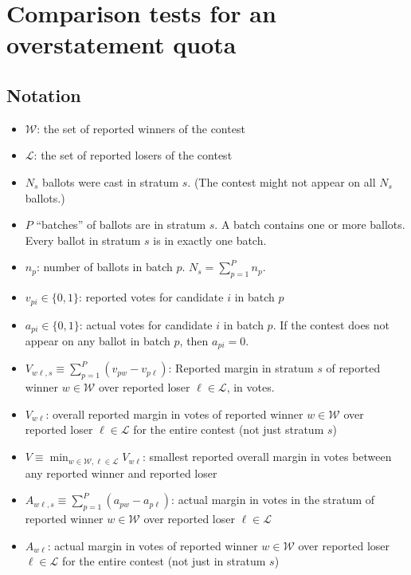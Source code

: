 \documentclass[runningheads]{llncs}
\begin{document}
\appendix
\section{Comparison tests for an overstatement quota}\label{sec:appendix-comparison}
\subsection{Notation}
\begin{itemize}
    \item  $\mathcal{W}$: the set of reported winners of the contest
    \item  $\mathcal{L}$: the set of reported losers of the contest
    \item  $N_s$ ballots were cast in stratum $s$. (The contest might not appear on all $N_s$ ballots.)
    \item  $P$ ``batches'' of ballots are in stratum $s$. A batch contains one or more ballots. Every ballot in stratum $s$ is in exactly one batch.
    \item  $n_p$: number of ballots in batch $p$. $N_s = \sum_{p=1}^P n_p$.
    \item  $v_{pi} \in \{0, 1\}$: reported votes for candidate $i$ in batch $p$
    \item  $a_{pi} \in \{0, 1\}$: actual votes for candidate $i$ in batch $p$. 
                  If the contest does not appear on any ballot in batch $p$, then $a_{pi} = 0$.
                  
    \item  $V_{w\ell,s} \equiv \sum_{p=1}^P (v_{pw} - v_{p\ell})$: 
Reported margin in stratum $s$ of reported winner $w \in \mathcal{W}$ over reported loser 
$\ell \in \mathcal{L}$, in votes.

    \item  $V_{w\ell}$: 
overall reported margin in votes of reported winner $w \in \mathcal{W}$ over reported loser 
$\ell \in \mathcal{L}$ for the entire contest (not just stratum $s$)

    \item  $V \equiv \min_{w \in \mathcal{W}, \ell \in \mathcal{L}} V_{w \ell}$: 
smallest reported overall margin in votes between any reported winner and reported loser

    \item  $A_{w\ell,s} \equiv \sum_{p=1}^P (a_{pw} - a_{p\ell})$: 
actual margin in votes in the stratum of reported winner $w \in \mathcal{W}$ over reported loser 
$\ell \in \mathcal{L}$

    \item  $A_{w\ell}$: 
actual margin in votes of reported winner $w \in \mathcal{W}$ over reported loser 
$\ell \in \mathcal{L}$ for the entire contest (not just in stratum $s$)

\end{itemize}
\end{document}
